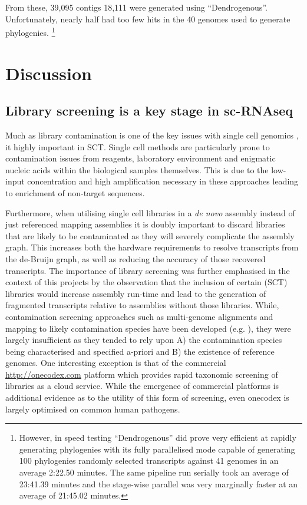 From these, 39,095 contigs 18,111 were generated using ``Dendrogenous''.  Unfortunately, nearly half had too few hits in the 40 genomes used 
to generate phylogenies.  \footnote{However, in speed testing ``Dendrogenous'' did prove very efficient at rapidly generating phylogenies with its
fully parallelised mode capable of generating 100 phylogenies randomly selected transcripts against 41 genomes in an average 2:22.50 minutes.
The same pipeline run serially took an average of 23:41.39 minutes and the stage-wise parallel was very marginally faster at 
an average of 21:45.02 minutes.}




\section{Discussion}

\subsection{Library screening is a key stage in sc-RNAseq}

Much as library contamination is one of the key issues with single cell genomics \citep{Blainey2013,Lusk2014}, it highly
important in SCT.  Single cell methods are particularly prone to contamination issues
from reagents, laboratory environment and enigmatic nucleic acids within the biological samples themselves.
This is due to the low-input concentration and high amplification necessary in these approaches \citep{Blainey2013} 
leading to enrichment of non-target sequences.

Furthermore, when utilising single cell libraries in a \textit{de novo} assembly instead of just referenced mapping assemblies
it is doubly important to discard libraries that are likely to be contaminated as they will severely complicate
the assembly graph. This increases both the hardware requirements to resolve transcripts from the de-Bruijn graph, as well
as reducing the accuracy of those recovered transcripts.  The importance of library screening was further emphasised
in the context of this projects by the observation that the inclusion of certain (SCT) libraries would increase
assembly run-time and lead to the generation of fragmented transcripts relative to assemblies without those
libraries.  While, contamination screening approaches such as multi-genome alignments and mapping to likely contamination
species have been developed (e.g. \citep{Hadfield2014}), they were largely insufficient as they tended to rely upon 
A) the contamination species being characterised and specified a-priori and B) the existence of reference genomes.
One interesting exception is that of the commercial \url{http://onecodex.com} platform which provides
rapid taxonomic screening of libraries as a cloud service.  While the emergence of commercial platforms
is additional evidence as to the utility of this form of screening, even onecodex is largely optimised
on common human pathogens.

